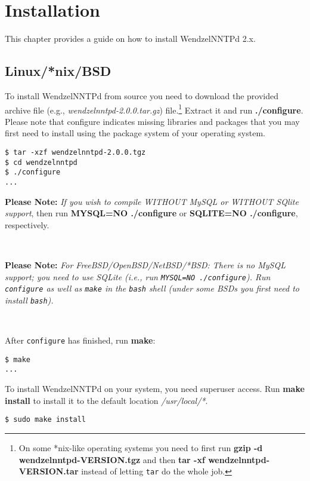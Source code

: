 \chapter{Installation}

This chapter provides a guide on how to install WendzelNNTPd 2.x.

\section{Linux/*nix/BSD}

To install WendzelNNTPd from source you need to download the provided archive file (e.g., \emph{wendzelnntpd-2.0.0.tar.gz}) file.\footnote{On some *nix-like operating systems you need to first run \textbf{gzip -d wendzelnntpd-VERSION.tgz} and then \textbf{tar -xf wendzelnntpd-VERSION.tar} instead of letting \texttt{tar} do the whole job.} Extract it and run \textbf{./configure}. Please note that configure indicates missing libraries and packages that you may first need to install using the package system of your operating system.

\begin{verbatim}
$ tar -xzf wendzelnntpd-2.0.0.tgz
$ cd wendzelnntpd
$ ./configure
...
\end{verbatim}

\textbf{Please Note:} \textit{If you wish to compile WITHOUT MySQL or WITHOUT SQlite support}, then run \textbf{MYSQL=NO ./configure} or \textbf{SQLITE=NO ./configure}, respectively.

~

\textbf{Please Note:} \textit{For FreeBSD/OpenBSD/NetBSD/*BSD: There is no MySQL support; you need to use SQLite (i.e., run \texttt{MYSQL=NO ./configure}). Run \texttt{configure} as well as \texttt{make} in the \texttt{bash} shell (under some BSDs you first need to install \texttt{bash}).}

~

After \texttt{configure} has finished, run \textbf{make}:

\begin{verbatim}
$ make
...
\end{verbatim}

To install WendzelNNTPd on your system, you need superuser access. Run \textbf{make install} to install it to the default location \textit{/usr/local/*}.

\begin{verbatim}
$ sudo make install
\end{verbatim}

